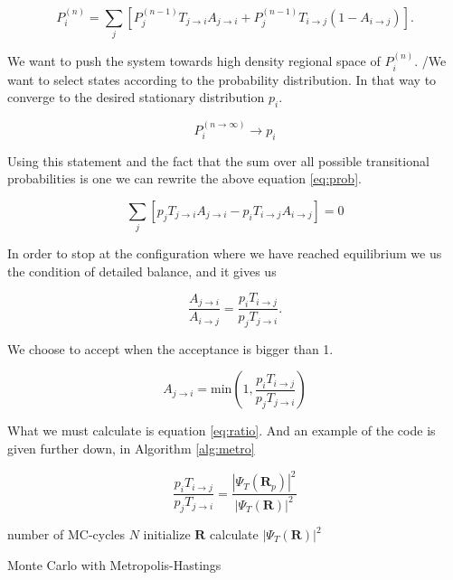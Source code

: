 \begin{equation}\label{eq:prob}
P_i^{(n)} = \sum_j \left[P_j^{(n-1)} T_{j \rightarrow i}A_{j \rightarrow i} + P_j^{(n-1)}T_{i \rightarrow j}(1 - A_{i \rightarrow j})\right].
\end{equation}

We want to push the system towards high density regional space of $P_i^{(n)}$. /We want to select states according to the probability distribution. In that way to converge to the desired stationary distribution $p_i$.

$$P_i^{(n \rightarrow \infty)} \rightarrow p_i$$

Using this statement and the fact that the sum over all possible transitional probabilities is one we can rewrite the above equation \ref{eq:prob}.

$$\sum_j [p_j T_{j \rightarrow i}A_{j \rightarrow i} - p_i T_{i \rightarrow j}A_{i \rightarrow j}] = 0$$

In order to stop at the configuration where we have reached equilibrium we us the condition of detailed balance, and it gives us 


$$\frac{A_{j \rightarrow i}}{A_{i \rightarrow j}} = \frac{p_i T_{i \rightarrow j}}{p_j T_{j \rightarrow i}}.$$

We choose to accept when the acceptance is bigger than 1. 

$$A_{j \rightarrow i} = \mathrm{min} \left( 1, \frac{p_i T_{i \rightarrow j}}{p_j T_{j \rightarrow i}}\right)$$

What we must calculate is equation \ref{eq:ratio}. And an example of the code is given further down, in Algorithm \ref{alg:metro}

\begin{equation}\label{eq:ratio}
\frac{p_i T_{i \rightarrow j}}{p_j T_{j \rightarrow i}} = \frac{|\Psi_T(\mathbf{R}_p)|^2}{|\Psi_T(\mathbf{R})|^2}
\end{equation}

\begin{algorithm}
number of MC-cycles $N$\;
initialize $\mathbf{R}$\;
calculate $|\Psi_T(\mathbf{R})|^2$\;
 \caption{Monte Carlo with Metropolis-Hastings}\label{alg:metro}
\end{algorithm}

